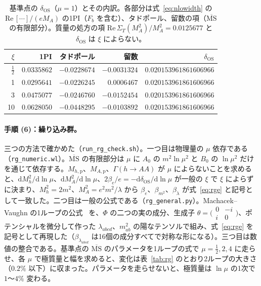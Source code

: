 \documentclass[a4paper,10pt]{ltjsarticle}
\newcommand{\dd}{\mathrm{d}}
\newcommand{\MSbar}{\overline{\mathrm{MS}}}
\newcommand{\re}{\mathrm{Re}\,}
\begin{document}
\begin{table}[tbp]
\centering\small
\caption{基準点の $\delta_{\mathrm{OS}}$（$\mu=1$）とその内訳。各部分は式~\eqref{eq:nlowidth} の $\re[\cdots]/(eM_A)$ の1PI（$F_b$ を含む）、タドポール、留数の項（$\MSbar$ の有限部分）。質量の処方の項 $\re\Sigma_T(M_A^2)/M_A^2=0.0125677$ と $\delta_{\mathrm{OS}}$ は $\xi$ によらない。}
\label{tab:nlo}
\begin{tabular}{rrrrr}
\toprule
$\xi$ & 1PI & タドポール & 留数 & $\delta_{\mathrm{OS}}$ \\
\midrule
$\frac12$ & $0.0335862$ & $-0.0228674$ & $-0.0031324$ & $0.020153961861606966$ \\
1 & $0.0295641$ & $-0.0226245$ & $0.0006467$ & $0.020153961861606966$ \\
3 & $0.0475077$ & $-0.0246760$ & $-0.0152454$ & $0.020153961861606966$ \\
10 & $0.0628050$ & $-0.0448295$ & $-0.0103892$ & $0.020153961861606966$ \\
\bottomrule
\end{tabular}
\end{table}

\paragraph{手順 (6)：繰り込み群。}三つの方法で確かめた（\texttt{run\_rg\_check.sh}）。一つ目は物理量の $\mu$ 依存である（\texttt{rg\_numeric.wl}）。$\MSbar$ の有限部分は $\mu$ に $A_0$ の $m^2\ln\mu^2$ と $B_0$ の $\ln\mu^2$ だけを通じて依存する。$M_{h,\mathrm p}$、$M_{A,\mathrm p}$、$\Gamma(h\to AA)$ が $\mu$ によらないことを求めると、$\dd M_h^2/\dd\ln\mu$、$\dd M_A^2/\dd\ln\mu$、$2\beta_e/e=-\dd\delta_{\mathrm{OS}}/\dd\ln\mu$ が一般の $\xi$ で $\xi$ によらずに決まり、$M_h^2=2m^2$、$M_A^2=e^2m^2/\lambda$ から $\beta_e$、$\beta_{m^2}$、$\beta_\lambda$ が式~\eqref{eq:rge} と記号として一致した。二つ目は一般の公式である（\texttt{rg\_general.py}）。Machacek--Vaughn の1ループの公式~\cite{mv1,mv3} を、$\Phi$ の二つの実の成分、生成子 $\theta=\bigl(\begin{smallmatrix}0&-i\\ i&0\end{smallmatrix}\bigr)$、ポテンシャルを微分して作った $\lambda_{abcd}$、$m^2_{ab}$ の陽なテンソルで組み、式~\eqref{eq:rge} を記号として再現した（$\beta_{\lambda_{abcd}}$ は16個の成分すべてで対称な形になる）。三つ目は数値の整合である。基準点の $\MSbar$ のパラメータを1ループの式で $\mu=\frac12,2,4$ に走らせ、各 $\mu$ で極質量と幅を求めると、変化は表~\ref{tab:rg} のとおり2ループの大きさ（$0.2\%$ 以下）に収まった。パラメータを走らせないと、極質量は $\ln\mu$ の1次で $1$〜$4\%$ 変わる。
\end{document}
